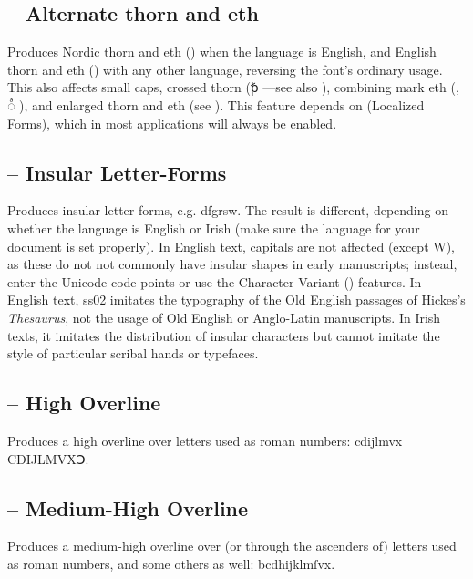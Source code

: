 \subsection{ --
Alternate thorn and eth}
Produces Nordic thorn and eth (\revthorn{{\th}{\dh}{\TH}}) when the language is English, and English thorn and eth
({\icel\revthorn{{\th}{\dh}{\TH}}}) with any other language, reversing the font’s ordinary usage.
This also affects small caps, crossed
thorn (ꝥ ---see also
\hyperlink{OtherLatin}{}), combining mark eth
(, ◌ᷙ ), and enlarged thorn and eth (see ).
This feature depends on  (Localized Forms), which in most applications will
always be enabled.

\subsection{ --
Insular Letter-Forms}
Produces insular letter-forms, e.g. {dfgrsw}. The result is different,
depending on whether the language is English or Irish (make sure the language for your document is set
properly). In English text, capitals are not affected (except W), as these do not not commonly have
insular shapes in early manuscripts; instead, enter the Unicode code points or use the Character Variant
() features. In English text, ss02 imitates the typography of the Old English
passages of Hickes’s \textit{Thesaurus}, not the usage of Old English or Anglo-Latin manuscripts. In
Irish texts, it imitates the distribution of insular characters but cannot imitate the style of
particular scribal hands or typefaces.

\subsection{ -- High
Overline}
Produces a high overline over letters used as roman numbers: {cdijlmvx CDIJLMVXↃ}.

\subsection{ --
Medium-High Overline}
Produces a medium-high overline over (or through the ascenders of) letters used as roman numbers, and some others as
well: {bcdhijklmſvx{\th}}.

